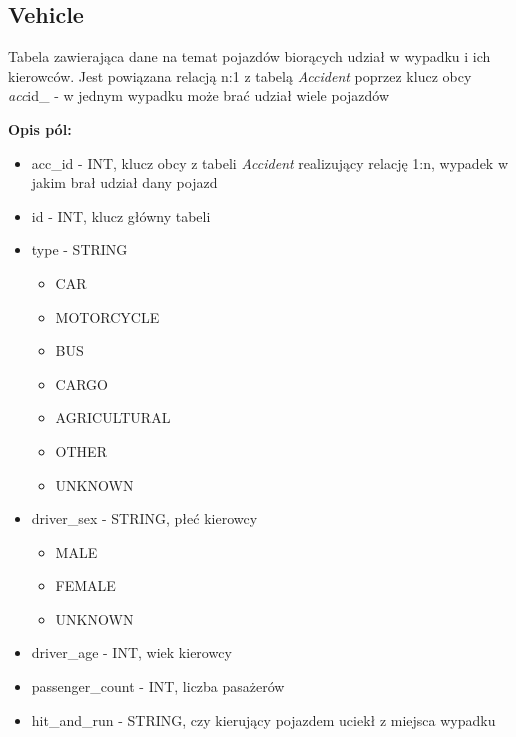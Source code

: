 \subsection{Vehicle}\label{vehicle}

Tabela zawierająca dane na temat pojazdów biorących udział w wypadku i
ich kierowców. Jest powiązana relacją n:1 z tabelą \emph{Accident}
poprzez klucz obcy \emph{acc}id\_ - w jednym wypadku może brać udział
wiele pojazdów

\textbf{Opis pól:}

\begin{itemize}
\item
  acc\_id - INT, klucz obcy z tabeli \emph{Accident} realizujący relację
  1:n, wypadek w jakim brał udział dany pojazd\\
\item
  id - INT, klucz główny tabeli\\
\item
  type - STRING

  \begin{itemize}
  \itemsep1pt\parskip0pt
  \item
    CAR\\
  \item
    MOTORCYCLE\\
  \item
    BUS\\
  \item
    CARGO\\
  \item
    AGRICULTURAL\\
  \item
    OTHER\\
  \item
    UNKNOWN\\
  \end{itemize}
\item
  driver\_sex - STRING, płeć kierowcy

  \begin{itemize}
  \itemsep1pt\parskip0pt
  \item
    MALE\\
  \item
    FEMALE\\
  \item
    UNKNOWN\\
  \end{itemize}
\item
  driver\_age - INT, wiek kierowcy\\
\item
  passenger\_count - INT, liczba pasażerów\\
\item
  hit\_and\_run - STRING, czy kierujący pojazdem uciekł z miejsca
  wypadku


\end{itemize}
